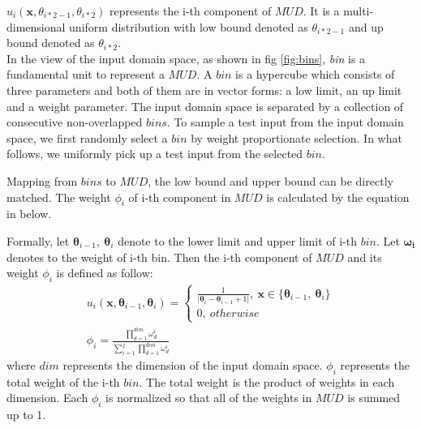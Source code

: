 \documentclass[journal]{IEEEtran}
\renewcommand{\vec}[1]{\mathbf{#1}}
\begin{document}
\(u_{i}(\vec{x},\theta_{i*2-1},\theta_{i*2})\) represents the i-th component of \(MUD\). It is a multi-dimensional uniform distribution with low bound denoted as \(\theta_{i*2-1}\) and up bound denoted as \(\theta_{i*2}\).\\

In the view of the input domain space, as shown in fig \ref{fig:bins}, \emph{bin} is a fundamental unit to represent a \(MUD\). A \(bin\) is a hypercube which consists of three parameters and both of them are in vector forms: a low limit, an up limit and a weight parameter. The input domain space is separated by a collection of consecutive non-overlapped \(bins\). To sample a test input from the input domain space, we first randomly select a \(bin\) by weight proportionate selection. In what follows, we uniformly pick up a test input from the selected \(bin\).

Mapping from \(bins\) to \(MUD\), the low bound and upper bound can be directly matched. The weight \(\phi_{i}\) of i-th component in \(MUD\) is calculated by the equation in below.

Formally, let \(\vec{\theta}_{i-1}, \ \vec{\theta}_{i}\) denote to the lower limit and upper limit of i-th \(bin\). Let \(\vec{\omega_{i}}\) denotes to the weight of i-th bin. Then the i-th component of \(MUD\) and its weight \(\phi_{i}\) is defined as follow:
\begin{equation}
\begin{array}{ll}
u_{i}(\vec{x},\vec{\theta}_{i-1}, \vec{\theta}_{i}) = \left\{
\begin{array}{rcl}
\frac{1}{|\vec{\theta}_{i} - \vec{\theta}_{i-1}+1|},  \ \vec{x} \in \{\vec{\theta}_{i-1},\ \vec{\theta}_{i}\} \\
0,\ otherwise
\end{array}		
\right. \\
\phi_{i} = \frac{\prod_{d=1}^{dim}\omega_{d}^i}{\sum_{i = 1}^{j} \prod_{d=1}^{dim}\omega_{d}^i}
\end{array}
\tag{4}
\end{equation}
where \(dim\) represents the dimension of the input domain space. \(\phi_{i}\) represents the total weight of the i-th \(bin\). The total weight is the product of weights in each dimension. Each \(\phi_{i}\) is normalized so that all of the weights in \(MUD\) is summed up to 1.
\end{document}
